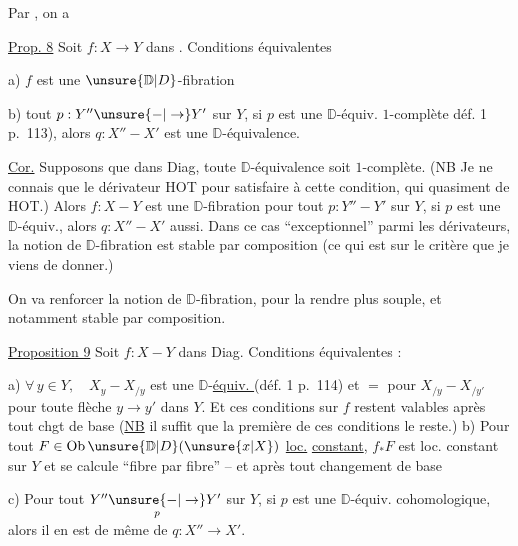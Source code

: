 Par , on a

\uline{Prop. 8} Soit $f:X\to Y$ dans . Conditions équivalentes

a) $f$ est une $\unsure{\mathbb D|D}$-fibration

b)  tout $p:Y''\unsure{\mathord{-}|\to}Y'$ sur $Y$, si $p$ est une $\mathbb D$-équiv. $1$-complète \unsure{(}déf. 1 p.~113), alors $q:X''-X'$ est une $\mathbb D$-équivalence.


\uline{Cor.} Supposons que dans Diag, toute $\mathbb D$-équivalence soit $1$-complète. (NB Je ne connais que le dérivateur HOT pour satisfaire à cette condition, qui  quasiment  de HOT.) Alors $f:X-Y$ est une $\mathbb D$-fibration  pour tout $p:Y''-Y'$ sur $Y$, si $p$ est une $\mathbb D$-équiv., alors $q:X''-X'$ aussi. Dans ce cas ``exceptionnel'' parmi les dérivateurs, la notion de $\mathbb D$-fibration est stable par composition (ce qui est  sur le critère que je viens de donner.)

On va renforcer la notion de $\mathbb D$-fibration, pour la rendre plus souple, et notamment stable par composition.

\uline{Proposition 9} Soit $f:X-Y$ dans Diag. Conditions équivalentes :

a) $\forall\,y\in Y,\quad X_y-X_{/y}$ est une $\mathbb D$-\uline{équiv. } (déf. 1 p.~114) et  $=$ pour $X_{/y}-X_{/y'}$ pour toute flèche $y\longrightarrow y'$ dans $Y$. Et ces conditions sur $f$ restent valables après tout chgt de base (\uline{NB} il suffit que la première de ces conditions le reste.)
b) Pour tout $F\in\operatorname{Ob}\unsure{\mathbb D|D}(\unsure{x|X})$ \uline{loc.} \uline{constant}, $f_*F$ est loc. constant sur $Y$ et se calcule ``fibre par fibre'' -- et  après tout changement de base

c) Pour tout $Y''\underset{p}{\unsure{\mathord{-}|\to}}Y'$ sur $Y$, si $p$ est une $\mathbb D$-équiv. cohomologique, alors il en est de même de $q:X''\to X'$.

